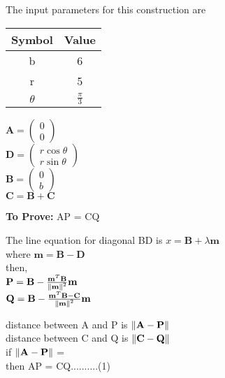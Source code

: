 \documentclass[10pt, a4paper]{article}
\newcommand{\myvec}[1]{\ensuremath{\begin{pmatrix}#1\end{pmatrix}}}
\let\vec\mathbf
\begin{document}
The input parameters for this construction are 
\begin{center}
\begin{tabular}{|c|c|}
	\hline
	\textbf{Symbol}&\textbf{Value}\\
	\hline
	b&6\\
	\hline
	r&5\\
	\hline
	$\theta$&$\frac{\pi}{3}$\\
	\hline
\end{tabular}
\begin{center}
$\vec{A}=\myvec{0\\0}$\\
$\vec{D}=\myvec{r\cos\theta \\ r\sin\theta}$\\
$\vec{B}=\myvec{0\\b}$\\
$\vec{C} = \vec{B}+\vec{C}$
\end{center}
\end{center}
\textbf{To Prove:} AP = CQ
\fi
\iffalse
		\begin{center}
		The line equation for diagonal BD is $x = \vec{B}+\lambda\vec{m}$
		\\
		where $\vec{m} = \vec{B}-\vec{D}$\\
		
		then,\\
		
		$\vec{P} = \vec{B} - \frac{\vec{m}^T \vec{B}}{\norm{\vec{m}}^2}\vec{m}$
	\\
	
	$\vec{Q} = \vec{B} - \frac{\vec{m}^T \vec{B-C}}{\norm{\vec{m}}^2}\vec{m}$\\
	\end{center}
	
	distance between A and P is $\norm{\vec{A-P}}$\\
	distance between C and Q is $\norm{\vec{C-Q}}$\\
	if $\norm{\vec{A-P}}$ =  \\
	then AP = CQ..........(1)
	
\end{document}
